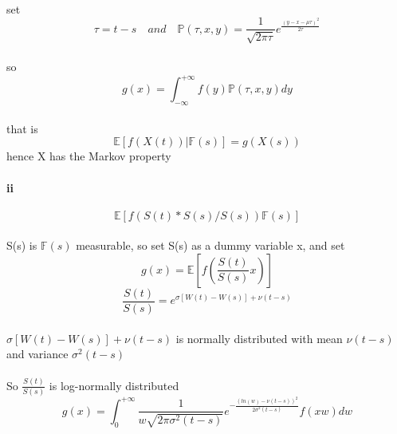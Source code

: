 \documentclass{article}
\begin{document}
\paragraph{}{set \begin{displaymath}
                   \tau =t-s\quad and \quad \mathbb{P}(\tau, x,y)=\frac{1}{\sqrt{2\pi \tau }}e^{{\frac{(y-x-\mu \tau)^2}{2\tau}}}
                 \end{displaymath}}
\paragraph{}{so \begin{displaymath}
                  g(x)=\int_{-\infty}^{+\infty}f(y)\mathbb{P}(\tau,x,y)dy
                \end{displaymath}}
\paragraph{}{that is \begin{displaymath}
                       \mathbb{E}[f(X(t))|\mathbb{F}(s)]=g(X(s))
                     \end{displaymath} hence X has the Markov property }
\paragraph{ii}{}
\begin{displaymath}
  \mathbb{E}[f(S(t)*S(s)/S(s))\mathbb{F}(s)]
\end{displaymath}
\paragraph{}{S(s) is $\mathbb{F}(s)$ measurable, so set S(s) as a dummy variable x, and set \begin{displaymath}
                                                                                              g(x)=\mathbb{E}[f(\frac{S(t)}{S(s)}x)]\end{displaymath}}
\begin{displaymath}
  \frac{S(t)}{S(s)}=e^{\sigma[W(t)-W(s)]+\nu (t-s)}
\end{displaymath}
\paragraph{}{$\sigma[W(t)-W(s)]+\nu (t-s)$ is normally distributed with mean $\nu(t-s)$ and variance $\sigma^2(t-s)$}
\paragraph{}{So $\frac{S(t)}{S(s)}$ is log-normally distributed}
\begin{displaymath}
  g(x)=\int_{0}^{+\infty}\frac{1}{w\sqrt{2\pi\sigma^2(t-s)}}e^{-\frac{(ln(w)-\nu(t-s))^2}{2\sigma^2(t-s)}}f(xw)dw
\end{displaymath}
\end{document}
